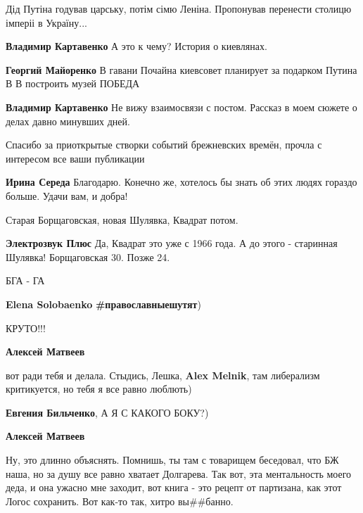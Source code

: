 \begin{itemize}
Дід Путіна годував царську, потім сімю Леніна. Пропонував перенести столицю імперіі в Україну...

\begin{itemize} %
\textbf{Владимир Картавенко} А это к чему? История о киевлянах.

\textbf{Георгий Майоренко} В гавани Почайна киевсовет планирует за подарком Путина В В построить музей ПОБЕДА

\textbf{Владимир Картавенко} Не вижу взаимосвязи с постом. Рассказ в моем сюжете о делах давно минувших дней.
\end{itemize} %


Спасибо за приоткрытые створки событий брежневских времён, прочла с интересом
все ваши публикации

\begin{itemize} %
\textbf{Ирина Середа} Благодарю. Конечно же, хотелось бы знать об этих людях гораздо больше. Удачи вам, и добра!
\end{itemize} %

Старая Борщаговская, новая Шулявка, Квадрат потом.

\begin{itemize} %
\textbf{Электрозвук Плюс} Да, Квадрат это уже с 1966 года. А до этого - старинная Шулявка! Борщаговская 30. Позже 24.
\end{itemize} %

БГА - ГА

\begin{itemize} %
\textbf{Elena Solobaenko} \textbf{\#православныешутят})
\end{itemize} %

КРУТО!!!

\begin{itemize} %
\textbf{Алексей Матвеев} 

вот ради тебя и делала. Стыдись, Лешка, \textbf{Alex Melnik}, там либерализм
критикуется, но тебя я все равно люблють)

\textbf{Евгения Бильченко}, А Я С КАКОГО БОКУ?)

\textbf{Алексей Матвеев} 

Ну, это длинно объяснять. Помнишь, ты там с товарищем беседовал, что БЖ наша,
но за душу все равно хватает Долгарева. Так вот, эта ментальность моего деда, и
она ужасно мне заходит, вот книга - это рецепт от партизана, как этот Логос
сохранить. Вот как-то так, хитро вы\#\#банно.


\end{itemize}
\end{itemize}
